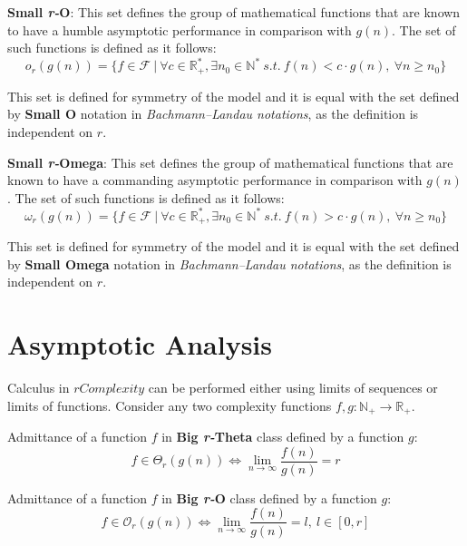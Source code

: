 \begin{definition} \textbf{Small \textit{r-}O}:
  This set defines the group of mathematical functions that are known to have a humble
 asymptotic performance in comparison with  $g(n)$. The set of such functions is defined as it follows:
  \[o_{r}(g(n)) = \lbrace f \in \mathcal{F}\ |\ \forall c \in \mathbb{R}^{*}_{+}, \exists n_{0} \in \mathbb{N}^{*}\ s.t.\  f(n) < c \cdot g(n),\  \forall n \geq n_{0} \rbrace\]
\end{definition}
\begin{remark}
  This set is defined for symmetry of the model and it is equal with the set defined by \textbf{Small O} notation in \textit{Bachmann–Landau notations}, as the definition is independent on $r$.
\end{remark}

\begin{definition} \textbf{Small \textit{r-}Omega}:
  This set defines the group of mathematical functions that are known to have a commanding asymptotic performance in comparison with  $g(n)$.
  The set of such functions is defined as it follows:
  \[\omega_{r}(g(n)) = \lbrace f \in \mathcal{F}\ |\ \forall c \in \mathbb{R}^{*}_{+}, \exists n_{0} \in \mathbb{N}^{*}\ s.t.\  f(n) > c \cdot g(n),\  \forall n \geq n_{0} \rbrace\]
\end{definition}
\begin{remark}
    This set is defined for symmetry of the model and it is equal with the set defined by \textbf{Small Omega} notation in \textit{Bachmann–Landau notations}, as the definition is independent on $r$.
\end{remark}

\section{Asymptotic Analysis}
Calculus in $rComplexity$ can be performed either using limits of sequences or limits of functions. Consider any two complexity functions $f,g:\mathbb{N}_{+}\longrightarrow\mathbb{R}_{+}$.

\begin{theorem} Admittance of a function $f$ in \textbf{Big \textit{r-}Theta} class defined by a function $g$: 
  \[ f \in \Theta_{r}(g(n)) \Leftrightarrow \lim_{n\to\infty} \dfrac{f(n)}{g(n)} = r \]
\end{theorem}   

\begin{theorem} Admittance of a function $f$ in \textbf{Big \textit{r-}O} class defined by a function $g$: 
    \[ f \in \mathcal{O}_{r}(g(n)) \Leftrightarrow \lim_{n\to\infty} \dfrac{f(n)}{g(n)} = l,\ l \in \left[ 0, r \right] \]
\end{theorem}   

